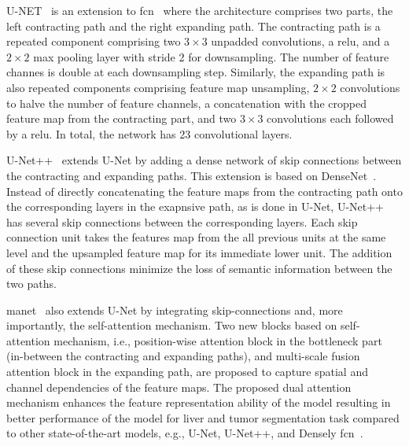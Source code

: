 \documentclass[mathematics,article,submit,pdftex,moreauthors]{Definitions/mdpi}
\begin{document}
U-NET~\cite{Ronneberger2015} is an extension to
 \ac{fcn}~\cite{Long2015} where the architecture
 comprises two parts, the left contracting path
 and the right expanding path. The contracting
 path is a repeated component comprising two $3\times 3$
 unpadded convolutions, a \ac{relu}, and a $2\times 2 $ max
 pooling layer with stride 2 for downsampling. The
 number of feature channes is double at each downsampling
 step. Similarly, the expanding path is also 
 repeated components comprising feature map unsampling,
 $2\times 2$ convolutions to halve the number of feature channels, 
 a concatenation with the cropped feature map from
 the contracting part, and two $3\times 3$ convolutions
 each followed by a \ac{relu}. In total, the network
 has 23 convolutional layers.

U-Net++~\cite{Zhou2018} extends U-Net by adding a dense
network of skip connections between the contracting
and expanding paths. This extension is based on 
DenseNet~\cite{Huang2017}. Instead of directly concatenating
the feature maps from the contracting path onto the corresponding
layers in the exapnsive path, as is done in U-Net, U-Net++
has several skip connections between the corresponding layers.
Each skip connection unit takes the features map from the all
previous units at the same level and the upsampled feature map
for its immediate lower unit. The addition of these
skip connections minimize the loss of semantic information
between the two paths.

\ac{manet}~\cite{Fan2020} also extends U-Net by integrating
skip-connections and, more importantly, the self-attention mechanism.
Two new blocks based on self-attention mechanism, i.e., 
position-wise attention block in the bottleneck
part (in-between the contracting and expanding paths),
and multi-scale fusion attention block in the expanding
path, are proposed to capture spatial and channel
dependencies of the feature maps. The proposed dual
attention mechanism enhances the feature representation ability
of the model resulting in better performance
of the model for liver and tumor segmentation
task compared to other state-of-the-art models,
e.g., U-Net, U-Net++, and Densely \ac{fcn}~\cite{Krishna2018}.
\end{document}
